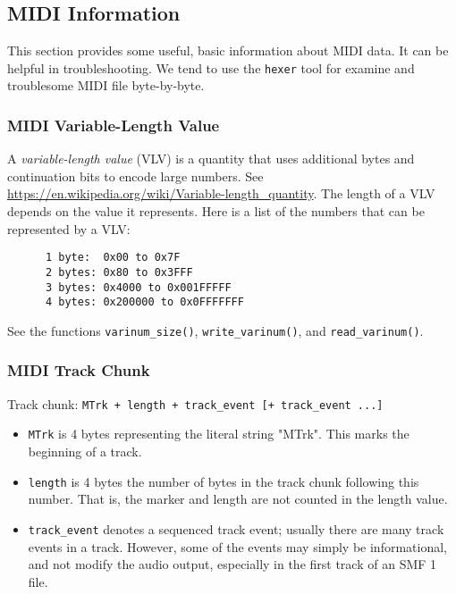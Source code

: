 \subsection{MIDI Information}
\label{subsec:midi_information}

   This section provides some useful, basic information about MIDI data.
   It can be helpful in troubleshooting.  We tend to use the
   \texttt{hexer} tool for examine and troublesome MIDI file byte-by-byte.

\subsubsection{MIDI Variable-Length Value}
\label{subsubsec:midi_variable_length_value}

   A \textsl{variable-length value} (VLV) is a quantity that uses additional
   bytes and continuation bits to encode large numbers.
   See \url{https://en.wikipedia.org/wiki/Variable-length\_quantity}.
   The length of a VLV depends on the value it represents.
   Here is a list of the numbers that can be represented by a VLV:

   \begin{verbatim}
      1 byte:  0x00 to 0x7F
      2 bytes: 0x80 to 0x3FFF
      3 bytes: 0x4000 to 0x001FFFFF
      4 bytes: 0x200000 to 0x0FFFFFFF
   \end{verbatim}

   See the functions
   \texttt{varinum\_size()},
   \texttt{write\_varinum()}, and
   \texttt{read\_varinum()}.

\subsubsection{MIDI Track Chunk}
\label{subsubsec:midi_track_chunk}

   Track chunk:
   \texttt{MTrk + length + track\_event [+ track\_event ...]}

   \begin{itemize}
      \item \texttt{MTrk} is 4 bytes representing the literal string "MTrk".
         This marks the beginning of a track.
      \item \texttt{length} is 4 bytes the number of bytes in the track
         chunk following this number.  That is, the marker and length are
         not counted in the length value.
      \item \texttt{track\_event} denotes a sequenced track event; usually
         there are many track events in a track.  However, some of the
         events may simply be informational, and not modify the audio
         output, especially in the first track of an SMF 1 file.
   \end{itemize}

